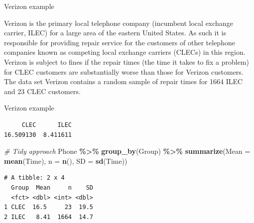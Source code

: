 \documentclass[
  ignorenonframetext,
]{beamer}
\newenvironment{Shaded}{\begin{snugshade}}{\end{snugshade}}
\newcommand{\AttributeTok}[1]{\textcolor[rgb]{0.13,0.29,0.53}{#1}}
\newcommand{\CommentTok}[1]{\textcolor[rgb]{0.56,0.35,0.01}{\textit{#1}}}
\newcommand{\FunctionTok}[1]{\textcolor[rgb]{0.13,0.29,0.53}{\textbf{#1}}}
\newcommand{\NormalTok}[1]{#1}
\newcommand{\OtherTok}[1]{\textcolor[rgb]{0.56,0.35,0.01}{#1}}
\newcommand{\SpecialCharTok}[1]{\textcolor[rgb]{0.81,0.36,0.00}{\textbf{#1}}}
\begin{document}
\begin{frame}{Verizon example}
\protect\hypertarget{verizon-example}{}
\begin{tcolorbox}
Verizon is the primary local telephone company (incumbent local exchange carrier, ILEC) for a large area of the eastern United States. As such it is responsible for providing repair service for the customers of other telephone companies known as competing local exchange carriers (CLECs) in this region. Verizon is subject to fines if the repair times (the time it takes to fix a problem) for CLEC customers are substantially worse than those for Verizon customers. The data set Verizon contains a random sample of repair times for 1664 ILEC and 23 CLEC customers.
\end{tcolorbox}
\end{frame}

\begin{frame}[fragile]{Verizon example}
\protect\hypertarget{verizon-example-1}{}
\normalsize

\begin{Shaded}
\end{Shaded}

\begin{verbatim}
     CLEC      ILEC 
16.509130  8.411611 
\end{verbatim}

\begin{Shaded}
\begin{Highlighting}[]
\CommentTok{\# Tidy approach}
\NormalTok{Phone }\SpecialCharTok{\%\textgreater{}\%} 
  \FunctionTok{group\_by}\NormalTok{(Group) }\SpecialCharTok{\%\textgreater{}\%} 
  \FunctionTok{summarize}\NormalTok{(}\AttributeTok{Mean =} \FunctionTok{mean}\NormalTok{(Time), }\AttributeTok{n =} \FunctionTok{n}\NormalTok{(), }\AttributeTok{SD =} \FunctionTok{sd}\NormalTok{(Time))}
\end{Highlighting}
\end{Shaded}

\begin{verbatim}
# A tibble: 2 x 4
  Group  Mean     n    SD
  <fct> <dbl> <int> <dbl>
1 CLEC  16.5     23  19.5
2 ILEC   8.41  1664  14.7
\end{verbatim}

\normalsize
\end{frame}
\end{document}
